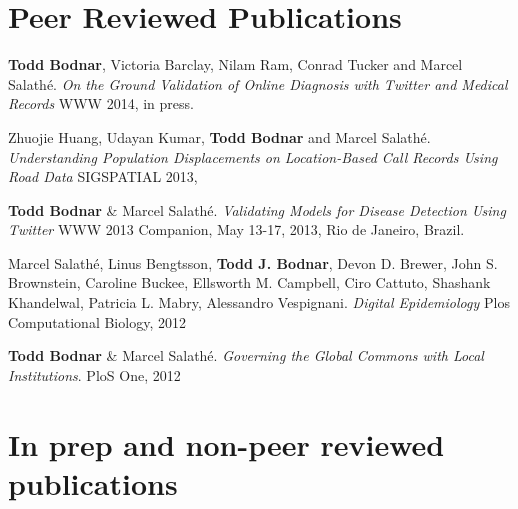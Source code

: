 \documentclass[margin,line]{res}
\newcommand{\linkToUrl}[1]{{\color{blue}\underline{\href{#1}{Link}}}}
\renewcommand{\linkToUrl}[1]{}
\begin{document}
\begin{resume}



\section{\sc Peer Reviewed Publications}

\begin{etaremune}[start=5,leftmargin=13pt]

\item \textbf{Todd Bodnar}, Victoria Barclay, Nilam Ram, Conrad Tucker and Marcel Salath\'e. \textit{On the Ground Validation of Online Diagnosis with Twitter and Medical Records} WWW 2014, in press.

\item Zhuojie Huang, Udayan Kumar, \textbf{Todd Bodnar} and Marcel Salath\'e. \textit{Understanding Population Displacements on Location-Based Call Records Using Road Data} SIGSPATIAL 2013, \linkToUrl{http://bit.ly/1dAjC5o}

\item \textbf{Todd Bodnar} \& Marcel Salath\'e. \textit{Validating Models for Disease Detection Using Twitter}  WWW 2013 Companion, May 13-17, 2013, Rio de Janeiro, Brazil. \linkToUrl{http://bit.ly/WWL1Gr}

\item Marcel Salath\'e, Linus Bengtsson, \textbf{Todd J. Bodnar}, Devon D. Brewer, John S. Brownstein, Caroline Buckee, Ellsworth M. Campbell, Ciro Cattuto, Shashank Khandelwal, Patricia L. Mabry,  Alessandro Vespignani. \textit{Digital Epidemiology} Plos Computational Biology, 2012 \linkToUrl{http://bitly.com/PO2fSx}

\item \textbf{Todd Bodnar} \& Marcel Salath\'e. \textit{Governing the Global Commons with Local Institutions}. PloS One, 2012 \linkToUrl{http://bit.ly/TtsZd5}
\end{etaremune}

\section{\sc In prep and non-peer reviewed publications}


\end{resume}
\end{document}

